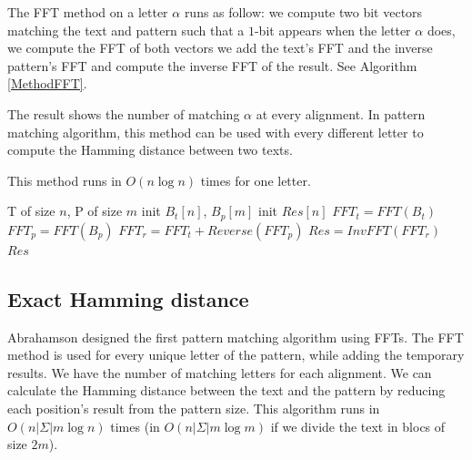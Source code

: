 \documentclass[preprint,12pt]{elsarticle}
\begin{document}
The FFT method on a letter $\alpha$ runs as follow:
we compute two bit vectors matching the text and pattern
such that a $1$-bit appears when the letter $\alpha$ does,
we compute the FFT of both vectors
we add the text's FFT and the inverse pattern's FFT
and compute the inverse FFT of the result.
See Algorithm \ref{MethodFFT}.

The result shows the number of matching $\alpha$ at every alignment.
In pattern matching algorithm, this method can be used with every different letter
to compute the Hamming distance between two texts.

This method runs in $O(n \log n)$ times for one letter.



\begin{algorithm}
\caption{$HD\_FFT(T, P, \alpha)$: }
\label{MethodFFT}
\begin{algorithmic}[1]
\REQUIRE T of size $n$, P of size $m$
\STATE init $B_t[n]$, $B_p[m]$ 
\STATE init $Res[n]$
\ENDFOR
{} 
	  
\ENDFOR
\STATE $FFT_t = FFT(B_t)$ 
\STATE $FFT_p = FFT(B_p)$
\STATE $FFT_r = FFT_t + Reverse(FFT_p)$
\STATE $Res = InvFFT(FFT_r)$ 
\RETURN $Res$

\end{algorithmic}
\end{algorithm}



\subsection{Exact Hamming distance}
\label{eHD}

Abrahamson \cite{ExactHD} designed the first pattern matching algorithm using FFTs.
The FFT method is used for every unique letter of the pattern, while adding the temporary results.
We have the number of matching letters for each alignment.
We can calculate the Hamming distance between the text and the pattern 
by reducing each position's result from the pattern size.
This algorithm runs in $O(n|\Sigma| m \log n)$ times
(in $O(n|\Sigma| m \log m)$ if we divide the text in blocs of size $2m$).
\end{document}
